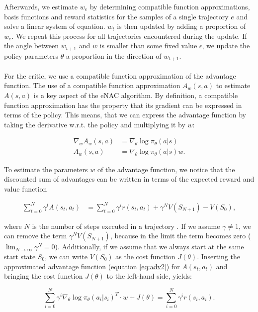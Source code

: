 Afterwards, we estimate $w_e$ by determining compatible function approximations, basis functions and reward statistics for the samples of a single trajectory $e$ and solve a linear system of equation. $w_t$ is then updated by adding a proportion of $w_e$. We repeat this process for all trajectories encountered during the update. If the angle between $w_{t+1}$ and $w$ is smaller than some fixed value $\epsilon$, we update the policy parameters $\theta$ a proportion in the direction of $w_{t+1}$.
\\\\
 For the critic, we use a compatible function approximation of the advantage function. The use of a compatible function approximation $A_w(s, a)$ to estimate $A(s, a)$ \citep{sutton2000policy} is a key aspect of the eNAC algorithm. By definition, a compatible function approximation has the property that its gradient can be expressed in terms of the policy. This means, that we can express the advantage function by taking the derivative w.r.t. the policy and multiplying it by $w$:

\begin{align}
\nabla_w A_w(s,a) &= \nabla_{\theta} \log \pi_{\theta}(a|s)\label{eq:adv1}\\
A_w(s,a) &= \nabla_{\theta} \log \pi_{\theta}(a|s)w. \label{eq:adv2}
\end{align}

\noindent To estimate the parameters $w$ of the advantage function, we notice that the discounted sum of advantages can be written in terms of the expected reward and value function

\begin{align}
\sum_{t = 0}^{N}\gamma^t A(s_t, a_t) &= \sum_{t = 0}^{N}\gamma^i r(s_t, a_t) + \gamma^N V(S_{N+1}) - V(S_0),
\end{align}

\noindent where $N$ is the number of steps executed in a trajectory \citep{peters2005natural}. If we assume $\gamma \neq 1$, we can remove the term $\gamma^N V(S_{N+1})$, because in the limit the term becomes zero ($\lim_{N \rightarrow \infty}\gamma^N = 0$). Additionally, if we assume that we always start at the same start state $S_0$, we can write $V(S_0)$ as the cost function $J(\theta)$. Inserting the approximated advantage function (equation \ref{eq:adv2}) for $A(s_t, a_t)$ and bringing the cost function $J(\theta)$ to the left-hand side, yields:

\begin{equation}
	\sum_{i = 0}^{N} \gamma^i \nabla_{\theta} \log \pi_{\theta}(a_i | s_i)^T \cdot w + J(\theta) = \sum_{i = 0}^{N}\gamma^i r(s_i, a_i).
\end{equation}

